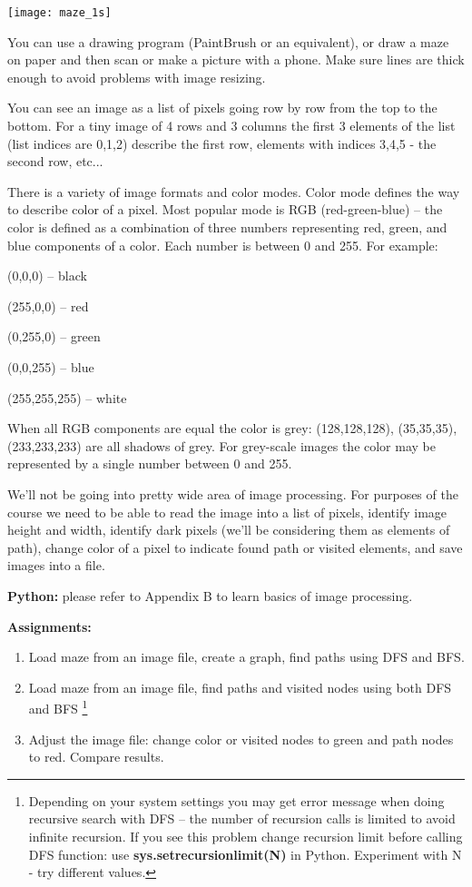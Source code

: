 \begin{center}
\texttt{[image: maze\_1s]}
\end{center}

You can use a drawing program (PaintBrush or an equivalent),
or draw a maze on paper and then scan or make a picture with
a phone. Make sure lines are thick enough to avoid problems
with image resizing.

You can see an image as a list of pixels going row by row
from the top to the bottom. For a tiny image of 4 rows and
3 columns the first 3 elements of the list (list indices are 0,1,2)
describe the first row, elements with indices 3,4,5 - the second row, etc...

There is a variety of image formats and color modes. Color mode
defines the way to describe color of a pixel. Most popular mode
is RGB (red-green-blue) -- the color is defined as a combination
of three numbers representing red, green, and blue components
of a color. Each number is between 0 and 255. For example:

(0,0,0) -- black

(255,0,0) -- red

(0,255,0) -- green

(0,0,255) -- blue

(255,255,255) -- white

When all RGB components are equal the color is grey: (128,128,128),
(35,35,35), (233,233,233) are all shadows of grey. For
grey-scale images the color may be represented by a single number
between 0 and 255.

We'll not be going into pretty wide area of image processing.
For purposes of the course we need to be able to read the image
into a list of pixels, identify image height and width, 
identify dark pixels
(we'll be considering them as elements of path), change color
of a pixel to indicate found path or visited elements, and save
images into a file.

\begin{tcolorbox}
\textbf{Python:} please refer to Appendix B to learn
basics of image processing.
\end{tcolorbox}

\begin{tcolorbox}
\textbf{Assignments:}
\begin{enumerate}
\item Load maze from an image file, create a graph, find paths
using DFS and BFS.
\item Load maze from an image file, find paths and visited nodes
using both DFS and BFS \footnote{Depending on your system
settings you may get error message when doing recursive search
with DFS -- the number of recursion calls is limited to avoid
infinite recursion. If you see this problem change recursion limit
before calling DFS function: use \textbf{sys.setrecursionlimit(N)}
in Python. Experiment with N - try different values.}
\item Adjust the image file: change color
or visited nodes to green and path nodes to red. Compare results.
\end{enumerate}
\end{tcolorbox}

